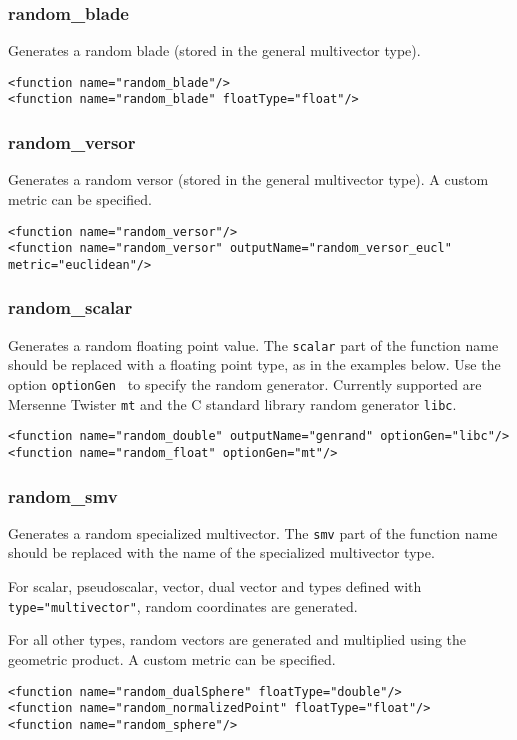 \documentclass[10pt, a4paper]{article}
\begin{document}
\subsubsection*{random\_blade}

Generates a random blade (stored in the general multivector type).
\begin{verbatim}
<function name="random_blade"/>
<function name="random_blade" floatType="float"/>
\end{verbatim}


\subsubsection*{random\_versor}

Generates a random versor (stored in the general multivector type).
A custom metric can be specified.
\begin{verbatim}
<function name="random_versor"/>
<function name="random_versor" outputName="random_versor_eucl" metric="euclidean"/>
\end{verbatim}


\subsubsection*{random\_scalar}

Generates a random floating point value. The {\tt scalar} part of the function
name should be replaced with a floating point type, as in the examples below.
Use the option {\tt optionGen } to specify the random generator. Currently
supported are Mersenne Twister {\tt mt} and the C standard library random
generator {\tt libc}.
\begin{verbatim}
<function name="random_double" outputName="genrand" optionGen="libc"/>
<function name="random_float" optionGen="mt"/>
\end{verbatim}

\subsubsection*{random\_smv}

Generates a random specialized multivector. The {\tt smv} part of the function
name should be replaced with the name of the specialized multivector type.

For scalar, pseudoscalar, vector, dual vector and types defined with
{\tt type="multivector"}, random coordinates are generated.

For all other types, random vectors are generated and multiplied using the 
geometric product. A custom metric can be specified.
\begin{verbatim}
<function name="random_dualSphere" floatType="double"/>
<function name="random_normalizedPoint" floatType="float"/>
<function name="random_sphere"/>
\end{verbatim}
\end{document}
